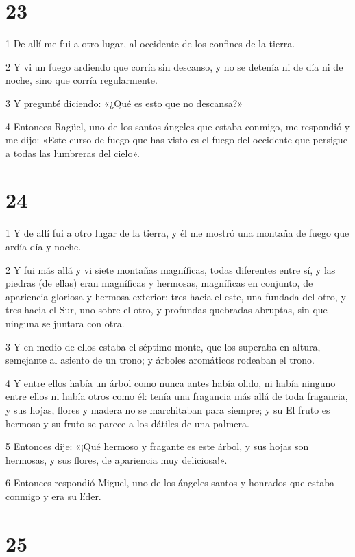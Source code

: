 \chapter{23}

\par 1 De allí me fui a otro lugar, al occidente de los confines de la tierra.
\par 2 Y vi un fuego ardiendo que corría sin descanso, y no se detenía ni de día ni de noche, sino que corría regularmente.
\par 3 Y pregunté diciendo: «¿Qué es esto que no descansa?»
\par 4 Entonces Ragüel, uno de los santos ángeles que estaba conmigo, me respondió y me dijo: «Este curso de fuego que has visto es el fuego del occidente que persigue a todas las lumbreras del cielo».

\chapter{24}

\par 1 Y de allí fui a otro lugar de la tierra, y él me mostró una montaña de fuego que ardía día y noche.
\par 2 Y fui más allá y vi siete montañas magníficas, todas diferentes entre sí, y las piedras (de ellas) eran magníficas y hermosas, magníficas en conjunto, de apariencia gloriosa y hermosa exterior: tres hacia el este, una fundada del otro, y tres hacia el Sur, uno sobre el otro, y profundas quebradas abruptas, sin que ninguna se juntara con otra.
\par 3 Y en medio de ellos estaba el séptimo monte, que los superaba en altura, semejante al asiento de un trono; y árboles aromáticos rodeaban el trono.
\par 4 Y entre ellos había un árbol como nunca antes había olido, ni había ninguno entre ellos ni había otros como él: tenía una fragancia más allá de toda fragancia, y sus hojas, flores y madera no se marchitaban para siempre; y su El fruto es hermoso y su fruto se parece a los dátiles de una palmera.
\par 5 Entonces dije: «¡Qué hermoso y fragante es este árbol, y sus hojas son hermosas, y sus flores, de apariencia muy deliciosa!».
\par 6 Entonces respondió Miguel, uno de los ángeles santos y honrados que estaba conmigo y era su líder.

\chapter{25}

